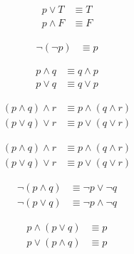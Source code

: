 \documentclass[12pt, openany, oneside]{book}
\begin{document}
\begin{tcolorbox}
	\begin{align}
		p \vee T   & \equiv T \\
		p \wedge F & \equiv F
	\end{align}
\end{tcolorbox}

\begin{tcolorbox}
	\begin{align}
		\neg (\neg p) & \equiv p
	\end{align}
\end{tcolorbox}

\begin{tcolorbox}
	\begin{align}
		p \wedge q & \equiv q \wedge p \\
		p \vee q   & \equiv q \vee p
	\end{align}
\end{tcolorbox}

\begin{tcolorbox}
	\begin{align}
		(p \wedge q) \wedge r & \equiv p \wedge (q \wedge r) \\
		(p \vee q) \vee r     & \equiv p \vee (q \vee r)
	\end{align}
\end{tcolorbox}

\begin{tcolorbox}
	\begin{align}
		(p \wedge q) \wedge r & \equiv p \wedge (q \wedge r) \\
		(p \vee q) \vee r     & \equiv p \vee (q \vee r)
	\end{align}
\end{tcolorbox}

\begin{tcolorbox}
	\begin{align}
		\neg (p \wedge q) & \equiv \neg p \vee \neg q   \\
		\neg (p \vee q)   & \equiv \neg p \wedge \neg q
	\end{align}
\end{tcolorbox}

\begin{tcolorbox}
	\begin{align}
		p \wedge (p \vee q) & \equiv p \\
		p \vee (p \wedge q) & \equiv p
	\end{align}
\end{tcolorbox}
\end{document}
